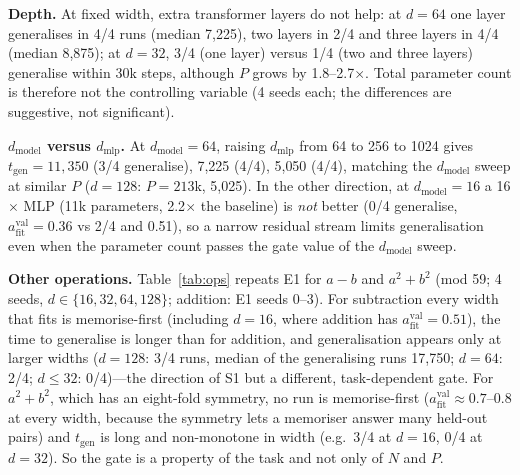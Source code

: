 \documentclass{article} %
\newcommand{\tgen}{t_{\mathrm{gen}}}
\newcommand{\vafit}{a^{\mathrm{val}}_{\mathrm{fit}}}
\begin{document}
\textbf{Depth.} At fixed width, extra transformer layers do not help: at $d{=}64$ one layer generalises in 4/4 runs (median 7{,}225), two layers in 2/4 and three layers in 4/4 (median 8{,}875); at $d{=}32$, 3/4 (one layer) versus 1/4 (two and three layers) generalise within 30k steps, although $P$ grows by 1.8--2.7$\times$. Total parameter count is therefore not the controlling variable (4 seeds each; the differences are suggestive, not significant).

\textbf{$d_{\mathrm{model}}$ versus $d_{\mathrm{mlp}}$.} At $d_{\mathrm{model}}{=}64$, raising $d_{\mathrm{mlp}}$ from 64 to 256 to 1024 gives $\tgen=11{,}350$ (3/4 generalise), 7{,}225 (4/4), 5{,}050 (4/4), matching the $d_{\mathrm{model}}$ sweep at similar $P$ ($d{=}128$: $P{=}213$k, 5{,}025). In the other direction, at $d_{\mathrm{model}}{=}16$ a 16$\times$ MLP (11k parameters, 2.2$\times$ the baseline) is \emph{not} better (0/4 generalise, $\vafit=0.36$ vs 2/4 and 0.51), so a narrow residual stream limits generalisation even when the parameter count passes the gate value of the $d_{\mathrm{model}}$ sweep.

\textbf{Other operations.} Table~\ref{tab:ops} repeats E1 for $a-b$ and $a^2+b^2$ (mod 59; 4 seeds, $d\in\{16,32,64,128\}$; addition: E1 seeds 0--3). For subtraction every width that fits is memorise-first (including $d{=}16$, where addition has $\vafit=0.51$), the time to generalise is longer than for addition, and generalisation appears only at larger widths ($d{=}128$: 3/4 runs, median of the generalising runs 17{,}750; $d{=}64$: 2/4; $d\le32$: 0/4)---the direction of S1 but a different, task-dependent gate. For $a^2+b^2$, which has an eight-fold symmetry, no run is memorise-first ($\vafit\approx0.7$--$0.8$ at every width, because the symmetry lets a memoriser answer many held-out pairs) and $\tgen$ is long and non-monotone in width (e.g.\ 3/4 at $d{=}16$, 0/4 at $d{=}32$). So the gate is a property of the task and not only of $N$ and $P$.

\begin{table}[t]
\caption{Other operations ($p{=}59$, frac 0.4, 4 seeds). fit/gen: runs reaching train$\ge$0.99 / val$\ge$0.99 within 30k steps; mem.: memorise-first runs; $t$: median over runs, censored runs counted as $\infty$; final val: median validation accuracy at the end.}
\label{tab:ops}
\begin{center}\small

\end{center}
\end{table}
\end{document}
